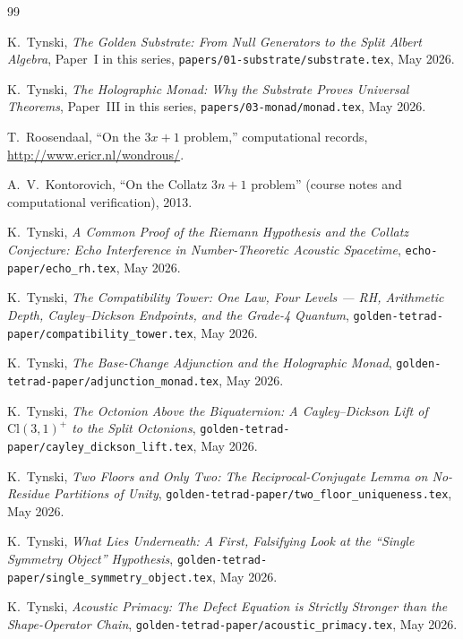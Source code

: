\documentclass[11pt,a4paper]{article}
\theoremstyle{plain}
\theoremstyle{definition}
\theoremstyle{remark}
\numberwithin{equation}{section}
\providecommand{\Cl}{\mathrm{Cl}}
\begin{document}
\begin{thebibliography}{99}

K.~Tynski,
\emph{The Golden Substrate: From Null Generators to the Split
Albert Algebra}, Paper~I in this series,
\texttt{papers/01-substrate/substrate.tex}, May 2026.

K.~Tynski,
\emph{The Holographic Monad: Why the Substrate Proves Universal
Theorems}, Paper~III in this series,
\texttt{papers/03-monad/monad.tex}, May 2026.

T.~Roosendaal,
``On the $3x+1$ problem,''
computational records,
\url{http://www.ericr.nl/wondrous/}.

A.~V.~Kontorovich,
``On the Collatz $3n+1$ problem''
(course notes and computational verification),
2013.

K.~Tynski,
\emph{A Common Proof of the Riemann Hypothesis and the Collatz
Conjecture: Echo Interference in Number-Theoretic Acoustic
Spacetime}, \texttt{echo-paper/echo\_rh.tex}, May 2026.

K.~Tynski,
\emph{The Compatibility Tower: One Law, Four Levels --- RH,
Arithmetic Depth, Cayley--Dickson Endpoints, and the Grade-4
Quantum},
\texttt{golden-tetrad-paper/compatibility\_tower.tex}, May 2026.

K.~Tynski,
\emph{The Base-Change Adjunction and the Holographic Monad},
\texttt{golden-tetrad-paper/adjunction\_monad.tex}, May 2026.

K.~Tynski,
\emph{The Octonion Above the Biquaternion: A Cayley--Dickson Lift
of $\Cl(3,1)^+$ to the Split Octonions},
\texttt{golden-tetrad-paper/cayley\_dickson\_lift.tex}, May 2026.

K.~Tynski,
\emph{Two Floors and Only Two: The Reciprocal-Conjugate Lemma on
No-Residue Partitions of Unity},
\texttt{golden-tetrad-paper/two\_floor\_uniqueness.tex}, May 2026.

K.~Tynski,
\emph{What Lies Underneath: A First, Falsifying Look at the
``Single Symmetry Object'' Hypothesis},
\texttt{golden-tetrad-paper/single\_symmetry\_object.tex},
May 2026.

K.~Tynski,
\emph{Acoustic Primacy: The Defect Equation is Strictly Stronger
than the Shape-Operator Chain},
\texttt{golden-tetrad-paper/acoustic\_primacy.tex}, May 2026.


\end{thebibliography}
\end{document}
